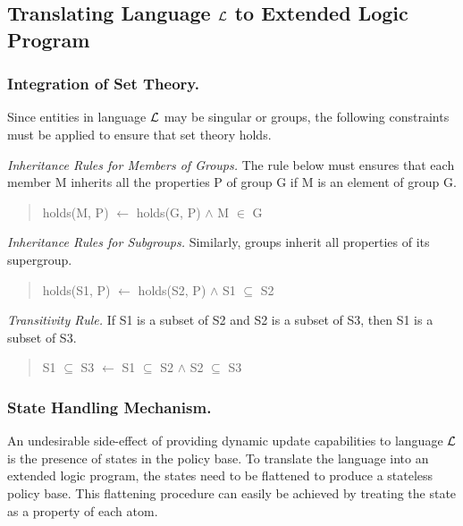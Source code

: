 \documentclass{llncs}
\begin{document}
    \subsection{Translating Language $\cal{L}$ to Extended Logic Program}

      \subsubsection{Integration of Set Theory.}

        Since entities in language $\cal{L}$ may be singular or groups,
        the following constraints must be applied to ensure that set theory
        holds.

        \emph{Inheritance Rules for Members of Groups.} The rule below must
        ensures that each member M inherits all the properties P of group G if
        M is an element of group G.

        \begin{quote}
          holds(M, P) $\leftarrow$ holds(G, P) $\land$ M $\in$ G
        \end{quote}

        \emph{Inheritance Rules for Subgroups.} Similarly, groups inherit all
        properties of its supergroup.

        \begin{quote}
          holds(S1, P) $\leftarrow$ holds(S2, P) $\land$ S1 $\subseteq$ S2
        \end{quote}

        \emph{Transitivity Rule.} If S1 is a subset of S2 and S2 is a subset
        of S3, then S1 is a subset of S3.

        \begin{quote}
          S1 $\subseteq$ S3 $\leftarrow$ S1 $\subseteq$ S2 $\land$ S2
          $\subseteq$ S3
        \end{quote}

      \subsubsection{State Handling Mechanism.}

        An undesirable side-effect of providing dynamic update capabilities to
        language $\cal{L}$ is the presence of states in the policy base. To
        translate the language into an extended logic program, the states need
        to be flattened to produce a stateless policy base. This flattening
        procedure can easily be achieved by treating the state as a property
        of each atom. 
\end{document}

